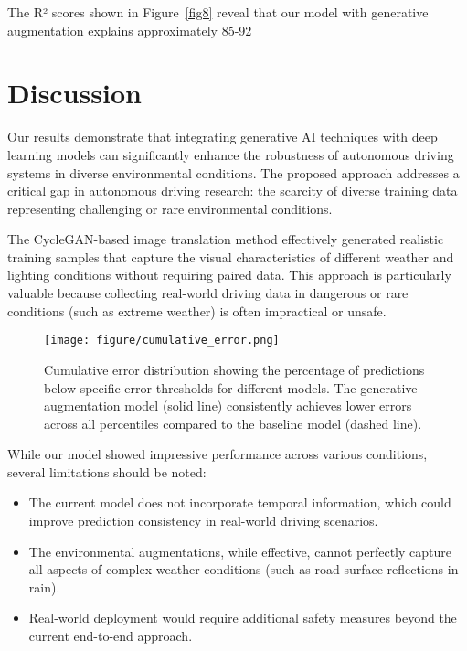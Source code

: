 \documentclass[pdflatex,sn-mathphys-num]{sn-jnl}%
\theoremstyle{thmstyleone}%
\theoremstyle{thmstyletwo}%
\theoremstyle{thmstylethree}%
\begin{document}
The R² scores shown in Figure~\ref{fig8} reveal that our model with generative augmentation explains approximately 85-92%

\section{Discussion}\label{sec4}

Our results demonstrate that integrating generative AI techniques with deep learning models can significantly enhance the robustness of autonomous driving systems in diverse environmental conditions. The proposed approach addresses a critical gap in autonomous driving research: the scarcity of diverse training data representing challenging or rare environmental conditions.

The CycleGAN-based image translation method effectively generated realistic training samples that capture the visual characteristics of different weather and lighting conditions without requiring paired data. This approach is particularly valuable because collecting real-world driving data in dangerous or rare conditions (such as extreme weather) is often impractical or unsafe.

\begin{figure}[h]
\centering
\texttt{[image: figure/cumulative\_error.png]}
\caption{Cumulative error distribution showing the percentage of predictions below specific error thresholds for different models. The generative augmentation model (solid line) consistently achieves lower errors across all percentiles compared to the baseline model (dashed line).}\label{fig10}
\end{figure}

While our model showed impressive performance across various conditions, several limitations should be noted:

\begin{itemize}
\item The current model does not incorporate temporal information, which could improve prediction consistency in real-world driving scenarios.
\item The environmental augmentations, while effective, cannot perfectly capture all aspects of complex weather conditions (such as road surface reflections in rain).
\item Real-world deployment would require additional safety measures beyond the current end-to-end approach.
\end{itemize}
\end{document}

